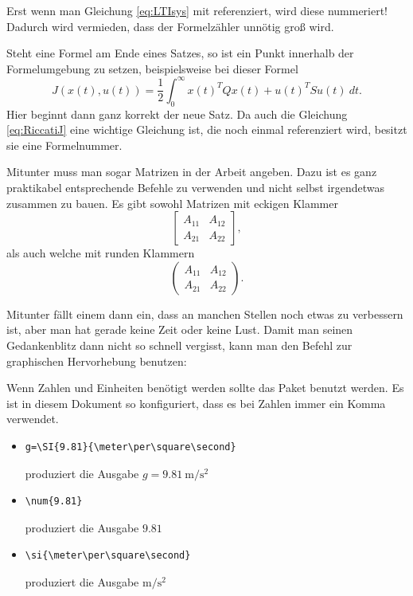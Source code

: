 Erst wenn man Gleichung \eqref{eq:LTIsys} mit  referenziert, wird diese nummeriert! Dadurch wird vermieden, dass der Formelzähler unnötig groß wird.

Steht eine Formel am Ende eines Satzes, so ist ein Punkt innerhalb der Formelumgebung zu setzen, beispielsweise bei dieser Formel
\begin{equation}  
\label{eq:RiccatiJ}
J(x(t), u(t)) = \frac{1}{2} \int_0^\infty x(t)^T Q x(t) + u(t)^T S u(t) \ dt. 
\end{equation}
Hier beginnt dann ganz korrekt der neue Satz. Da auch die Gleichung \eqref{eq:RiccatiJ} eine wichtige Gleichung ist, die noch einmal referenziert wird, besitzt sie eine Formelnummer.

Mitunter muss man sogar Matrizen in der Arbeit angeben. Dazu ist es ganz praktikabel entsprechende Befehle zu verwenden und nicht selbst irgendetwas zusammen zu bauen. Es gibt sowohl Matrizen mit eckigen Klammer
\begin{equation}
\begin{bmatrix} A_{11} & A_{12} \\ A_{21} & A_{22} \end{bmatrix},
\end{equation}
als auch welche mit runden Klammern
\begin{equation*}
\begin{pmatrix} A_{11} & A_{12} \\ A_{21} & A_{22} \end{pmatrix}.
\end{equation*}

Mitunter fällt einem dann ein, dass an manchen Stellen noch etwas zu verbessern ist, aber man hat gerade keine Zeit oder keine Lust. Damit man seinen Gedankenblitz dann nicht so schnell vergisst, kann man den Befehl  zur graphischen Hervorhebung benutzen:


Wenn Zahlen und Einheiten benötigt werden sollte das Paket  benutzt werden. Es ist in diesem Dokument so konfiguriert, dass es bei Zahlen immer ein Komma verwendet. 

\begin{itemize}
	\item{} 
	\begin{lstlisting}[style=myLatexStyle]
	g=\SI{9.81}{\meter\per\square\second}
	\end{lstlisting} produziert die Ausgabe $g=\SI{9.81}{\meter\per\square\second}$\\
	\item{} 
	\begin{lstlisting}[style=myLatexStyle]
	\num{9.81}
	\end{lstlisting} produziert die Ausgabe $\num{9.81}$\\
	\item{} 
	\begin{lstlisting}[style=myLatexStyle]
	\si{\meter\per\square\second}
	\end{lstlisting} produziert die Ausgabe $\si{\meter\per\square\second}$
\end{itemize}
	
